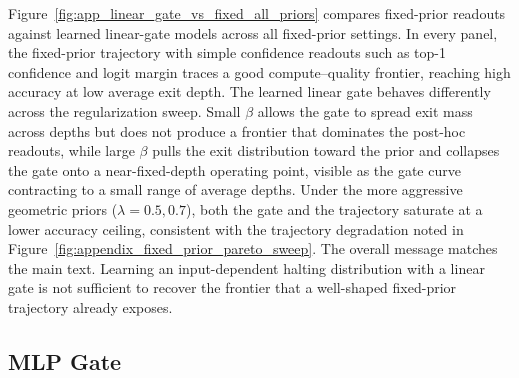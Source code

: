 \documentclass[10pt]{article} %
\begin{document}
Figure~\ref{fig:app_linear_gate_vs_fixed_all_priors} compares fixed-prior readouts against learned linear-gate models across all fixed-prior settings. In every panel, the fixed-prior trajectory with simple confidence readouts such as top-1 confidence and logit margin traces a good compute--quality frontier, reaching high accuracy at low average exit depth. The learned linear gate behaves differently across the regularization sweep. Small $\beta$ allows the gate to spread exit mass across depths but does not produce a frontier that dominates the post-hoc readouts, while large $\beta$ pulls the exit distribution toward the prior and collapses the gate onto a near-fixed-depth operating point, visible as the gate curve contracting to a small range of average depths. Under the more aggressive geometric priors ($\lambda = 0.5, 0.7$), both the gate and the trajectory saturate at a lower accuracy ceiling, consistent with the trajectory degradation noted in Figure~\ref{fig:appendix_fixed_prior_pareto_sweep}. The overall message matches the main text. Learning an input-dependent halting distribution with a linear gate is not sufficient to recover the frontier that a well-shaped fixed-prior trajectory already exposes.

\subsection{MLP Gate}
\label{app:mlp-gate}
\end{document}
